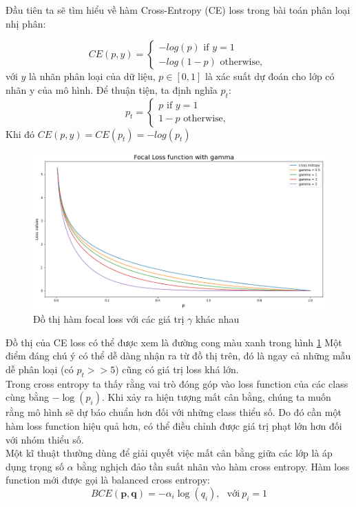 \documentclass[a4paper, 12pt]{report}
\begin{document}
Đầu tiên ta sẽ tìm hiểu về hàm Cross-Entropy (CE) loss trong bài toán phân loại nhị phân:

\begin{equation}
CE(p,y) = 
\begin{cases} 
-log(p) \textrm{     if      }  y =1 \\
-log(1-p) \textrm{     otherwise,      }
\end{cases}
\end{equation}
với $y$ là nhãn phân loại của dữ liệu,  $p \in [0, 1]$ là xác suất dự đoán cho lớp có nhãn y của mô hình. Để thuận tiện, ta định nghĩa $p_t$:
\begin{equation}
p_t = 
\begin{cases} 
p \textrm{     if      }  y =1 \\
1-p \textrm{     otherwise,      }
\end{cases}
\end{equation}
Khi đó $CE(p,y)=CE(p_t)=-log(p_t)$ \\
\begin{figure}[!h]
	\centering
	\includegraphics[width=1\linewidth]{Images/FocalLoss_6_1}
	\caption{Đồ thị hàm focal loss với các giá trị $\gamma$ khác nhau}
	\label{fig:focal-loss_gamma}
\end{figure} 

Đồ thị của CE loss có thể được xem là đường cong màu xanh trong hình \ref{fig:focal-loss_gamma} Một điểm đáng chú ý có thể dễ dàng nhận ra từ đồ thị trên, đó là ngay cả những mẫu dễ phân loại  (có $p_{t} >> 5$) cũng có giá trị loss khá lớn.\\
Trong cross entropy ta thấy rằng vai trò đóng góp vào loss function của các class cùng bằng $-\log(p_i)$. Khi xảy ra hiện tượng mất cân bằng, chúng ta muốn rằng mô hình sẽ dự báo chuẩn hơn đối với những class thiểu số. Do đó cần một hàm loss function hiệu quả hơn, có thể điều chỉnh được giá trị phạt lớn hơn đối với nhóm thiểu số. \\
Một kĩ thuật thường dùng để giải quyết việc mất cân bằng giữa các lớp là áp dụng trọng số $\alpha$ bằng nghịch đảo tần suất nhãn vào hàm cross entropy. Hàm loss function mới được gọi là balanced cross entropy:
\begin{equation}
BCE(\mathbf{p}, \mathbf{q}) = -\alpha_i\log(q_i),~~~ \text{với} ~ p_i=1
\end{equation}
\end{document}
